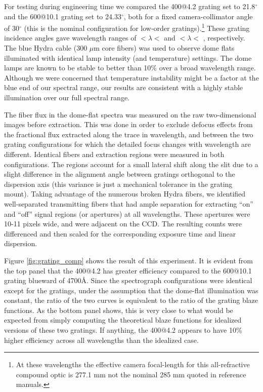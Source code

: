 For testing during engineering time we compared the 400@4.2 grating
set to 21.8$^{\circ}$ and the 600@10.1 grating set to 24.33$^{\circ}$,
both for a fixed camera-collimator angle of 30$^{\circ}$ (this is the
nominal configuration for low-order gratings).\footnote{At these
  wavelengths the effective camera focal-length for this
  all-refractive compound optic is 277.1 mm not the nominal 285 mm
  quoted in reference manuals.} These grating incidence angles gave
wavelength ranges of $< \lambda <$  and
$< \lambda <$ , respectively. The blue
Hydra cable (300 $\mu$m core fibers) was used to observe dome flats
illuminated with identical lamp intensity (and temperature)
settings. The dome lamps are known to be stable to better than 10\%
over a broad wavelength range. Although we were concerned that
temperature instability might be a factor at the blue end of our
spectral range, our results are consistent with a highly stable
illumination over our full spectral range.

The fiber flux in the dome-flat spectra was measured on the raw
two-dimensional images before extraction. This was done in order to
exclude defocus effects from the fractional flux extracted along the
trace in wavelength, and between the two grating configurations for
which the detailed focus changes with wavelength are different.
Identical fibers and extraction regions were measured in both
configurations. The regions account for a small lateral shift along
the slit due to a slight difference in the alignment angle between
gratings orthogonal to the dispersion axis (this variance is just a
mechanical tolerance in the grating mount). Taking advantage of the
numerous broken Hydra fibers, we identified well-separated
transmitting fibers that had ample separation for extracting ``on''
and ``off'' signal regions (or apertures) at all wavelengths.  These
apertures were 10-11 pixels wide, and were adjacent on the CCD.  The
resulting counts were differenced and then scaled for the
corresponding exposure time and linear dispersion. 

Figure \ref{fig:grating_comp} shows the result of this experiment. It
is evident from the top panel that the 400@4.2 has greater efficiency
compared to the 600@10.1 grating blueward of 4700\AA. Since the
spectrograph configurations were identical except for the gratings,
under the assumption that the dome-flat illumination was constant, the
ratio of the two curves is equivalent to the ratio of the grating
blaze functions. As the bottom panel shows, this is very close to what
would be expected from simply computing the theoretical blaze
functions for idealized versions of these two gratings. If anything,
the 400@4.2 appears to have 10\% higher efficiency across all
wavelengths than the idealized case.

